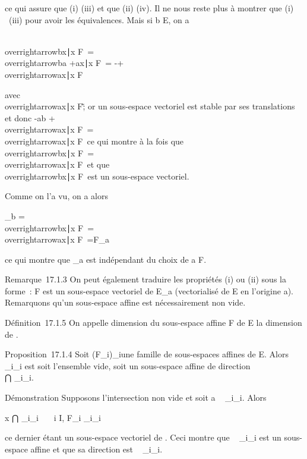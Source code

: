 \documentclass[]{article}
\begin{document}
ce qui assure que (i) \Leftrightarrow(iii) et que (ii) \Leftrightarrow(iv). Il ne nous reste plus à
montrer que (i) \rigtharrow~(iii) pour avoir les équivalences. Mais si b \in E, on a

\\overrightarrowbx∣x
\in F\ =
\\overrightarrowba
+\overrightarrow ax∣x \in
F\ = -\overrightarrowab +
\\overrightarrowax∣x
\in F\

avec \overrightarrowab
\in\\overrightarrowax∣x
\in F\~; or un sous-espace vectoriel est stable par ses
translations et donc -\overrightarrow ab +
\\overrightarrowax∣x
\in F\ =
\\overrightarrowax∣x
\in F\ ce qui montre à la fois que
\\overrightarrowbx∣x
\in F\ =
\\overrightarrowax∣x
\in F\ et que
\\overrightarrowbx∣x
\in F\ est un sous-espace vectoriel.

Comme on l'a vu, on a alors

\overrightarrowF\_b =
\\overrightarrowbx∣x
\in F\ =
\\overrightarrowax∣x
\in F\ =\overrightarrow F\_a

ce qui montre que \overrightarrowF\_a est
indépendant du choix de a \in F.

Remarque~17.1.3 On peut également traduire les propriétés (i) ou (ii)
sous la forme~: F est un sous-espace vectoriel de E\_a
(vectorialisé de E en l'origine a). Remarquons qu'un sous-espace affine
est nécessairement non vide.

Définition~17.1.5 On appelle dimension du sous-espace affine F de E la
dimension de \overrightarrowF.

Proposition~17.1.4 Soit (F\_i)\_i\inI une famille de
sous-espaces affines de E. Alors
\⋂ ~
\_i\inIF\_i est soit l'ensemble vide, soit un sous-espace
affine de direction \\⋂
 \_i\inI\overrightarrowF\_i.

Démonstration Supposons l'intersection non vide et soit a
\in\⋂ ~
\_i\inIF\_i. Alors

x \in⋂ \_i\inIF\_i~
\Leftrightarrow \forall~~i \in I,
\overrightarrowax \in\overrightarrow
F\_i \Leftrightarrow
\overrightarrowax \in\⋂
\_i\inI\overrightarrowF\_i

ce dernier étant un sous-espace vectoriel de
\overrightarrowE. Ceci montre que
\⋂ ~
\_i\inIF\_i est un sous-espace affine et que sa direction
est \⋂ ~
\_i\inI\overrightarrowF\_i.
\end{document}
